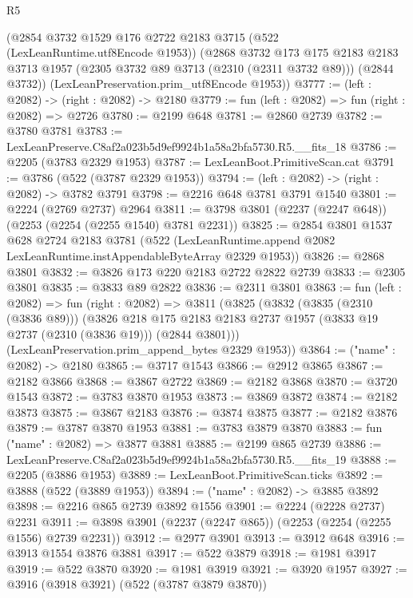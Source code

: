 \begin{lexlean}{R5}
\begin{coremodule}
    (@2854
      @3732
      @1529
      @176
      @2722
      @2183
      @3715
      (@522 (LexLeanRuntime.utf8Encode @1953))
      (@2868
        @3732
        @173
        @175
        @2183
        @2183
        @3713
        @1957
        (@2305 @3732 @89 @3713 (@2310 (@2311 @3732 @89)))
        (@2844 @3732))
      (LexLeanPreservation.prim_utf8Encode @1953))
@3777 := (left : @2082) -> (right : @2082) -> @2180
@3779 := fun (left : @2082) => fun (right : @2082) => @2726
@3780 := @2199 @648
@3781 := @2860 @2739
@3782 := @3780 @3781
@3783 := LexLeanPreserve.C8af2a023b5d9ef9924b1a58a2bfa5730.R5.__fits_18
@3786 := @2205 (@3783 @2329 @1953)
@3787 := LexLeanBoot.PrimitiveScan.cat
@3791 := @3786 (@522 (@3787 @2329 @1953))
@3794 := (left : @2082) -> (right : @2082) -> @3782 @3791
@3798 := @2216 @648 @3781 @3791 @1540
@3801 := @2224 (@2769 @2737) @2964
@3811 := @3798 @3801 (@2237 (@2247 @648)) (@2253 (@2254 (@2255 @1540) @3781 @2231))
@3825 := @2854
    @3801
    @1537
    @628
    @2724
    @2183
    @3781
    (@522 (LexLeanRuntime.append @2082 LexLeanRuntime.instAppendableByteArray @2329 @1953))
@3826 := @2868 @3801
@3832 := @3826 @173 @220 @2183 @2722 @2822 @2739
@3833 := @2305 @3801
@3835 := @3833 @89 @2822
@3836 := @2311 @3801
@3863 := fun (left : @2082) =>
  fun (right : @2082) =>
  @3811
    (@3825
      (@3832
        (@3835 (@2310 (@3836 @89)))
        (@3826
          @218
          @175
          @2183
          @2183
          @2737
          @1957
          (@3833 @19 @2737 (@2310 (@3836 @19)))
          (@2844 @3801)))
      (LexLeanPreservation.prim_append_bytes @2329 @1953))
@3864 := ("name" : @2082) -> @2180
@3865 := @3717 @1543
@3866 := @2912 @3865
@3867 := @2182 @3866
@3868 := @3867 @2722
@3869 := @2182 @3868
@3870 := @3720 @1543
@3872 := @3783 @3870 @1953
@3873 := @3869 @3872
@3874 := @2182 @3873
@3875 := @3867 @2183
@3876 := @3874 @3875
@3877 := @2182 @3876
@3879 := @3787 @3870 @1953
@3881 := @3783 @3879 @3870
@3883 := fun ("name" : @2082) => @3877 @3881
@3885 := @2199 @865 @2739
@3886 := LexLeanPreserve.C8af2a023b5d9ef9924b1a58a2bfa5730.R5.__fits_19
@3888 := @2205 (@3886 @1953)
@3889 := LexLeanBoot.PrimitiveScan.ticks
@3892 := @3888 (@522 (@3889 @1953))
@3894 := ("name" : @2082) -> @3885 @3892
@3898 := @2216 @865 @2739 @3892 @1556
@3901 := @2224 (@2228 @2737) @2231
@3911 := @3898 @3901 (@2237 (@2247 @865)) (@2253 (@2254 (@2255 @1556) @2739 @2231))
@3912 := @2977 @3901
@3913 := @3912 @648
@3916 := @3913 @1554 @3876 @3881
@3917 := @522 @3879
@3918 := @1981 @3917
@3919 := @522 @3870
@3920 := @1981 @3919
@3921 := @3920 @1957
@3927 := @3916 (@3918 @3921) (@522 (@3787 @3879 @3870))

\end{coremodule}
\end{lexlean}
